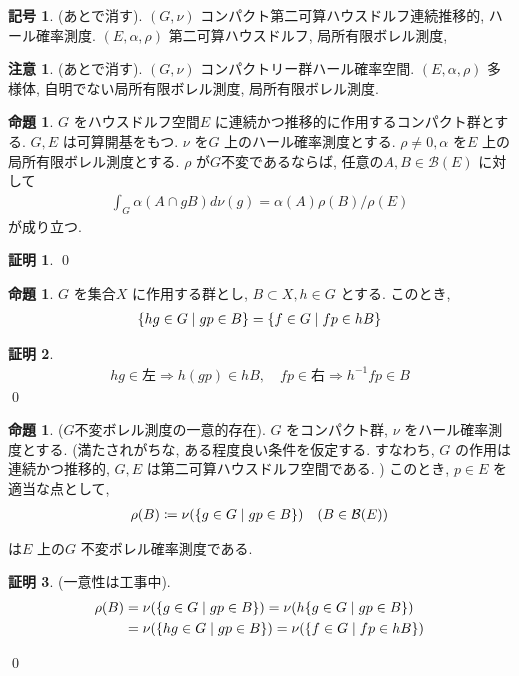 \documentclass[10pt, fleqn, label-section=none]{bxjsarticle}
\theoremstyle{definition}
\newtheorem{prop}[dfn]{命題}
\newtheorem{notation}[dfn]{記号}
\newtheorem*{pf*}{証明}
\newtheorem{remark}[dfn]{注意}
\newcommand{\cbra}[1]{\mleft\{#1\mright\}}
\newcommand{\naraba}{\Rightarrow}
\renewcommand{\;}{\, ; \,}
\begin{document}
\begin{notation}(あとで消す). $(G, \nu)$ コンパクト第二可算ハウスドルフ連続推移的, ハール確率測度. 
$(E, \alpha, \rho)$ 第二可算ハウスドルフ, 局所有限ボレル測度, 

\end{notation}

\begin{remark}(あとで消す). $(G, \nu)$ コンパクトリー群ハール確率空間. $(E, \alpha, \rho)$ 多様体, 自明でない局所有限ボレル測度, 局所有限ボレル測度. 

\end{remark}


\begin{prop}$G$ をハウスドルフ空間$E$ に連続かつ推移的に作用するコンパクト群とする. $G, E$ は可算開基をもつ. $\nu$ を$G$ 上のハール確率測度とする. $\rho \neq 0, \alpha $ を$E$ 上の局所有限ボレル測度とする. $\rho$ が$G$不変であるならば, 任意の$A, B \in \mathcal B (E) $ に対して
\begin{align*} \int_G \alpha(A \cap gB) d\nu(g) = \alpha (A) \rho(B) / \rho (E)  \end{align*} 
が成り立つ. 
\end{prop}
\begin{pf*}




\qed
\end{pf*}

\begin{prop}$G$ を集合$X$ に作用する群とし, $B \subset X, h \in G$ とする. このとき, 
\begin{align*} \cbra{hg \in G \mid gp \in B } = \cbra{f \in G \mid fp \in hB }\end{align*}
\end{prop}
\begin{pf*}
\begin{align*} hg \in \textrm{左} \naraba h(gp) \in hB , \quad
fp \in \textrm{右} \naraba h^{-1} fp \in B
\end{align*}
\qed
\end{pf*}



\begin{prop}($G$不変ボレル測度の一意的存在). $G$ をコンパクト群, $\nu$ をハール確率測度とする. (満たされがちな, ある程度良い条件を仮定する. すなわち, $G$ の作用は連続かつ推移的, $G, E$ は第二可算ハウスドルフ空間である. ) このとき, $p \in E$ を適当な点として, 
\begin{align*} \rho(B) \coloneqq \nu (\cbra{g \in G \mid gp \in B})      \quad (B \in \mathcal B (E) ) \end{align*}

は$E$ 上の$G$ 不変ボレル確率測度である. 
\end{prop}
\begin{pf*}(一意性は工事中). 
\begin{align*} \rho(B) &= \nu (  \cbra{g \in G \mid gp \in B}   ) = \nu(h  \cbra{g \in G \mid gp \in B} )   \\
&= \nu(  \cbra{h g \in G \mid gp \in B} ) = \nu(  \cbra{f \in G \mid fp \in hB} ) 
\end{align*}

\qed
\end{pf*}
\end{document}
